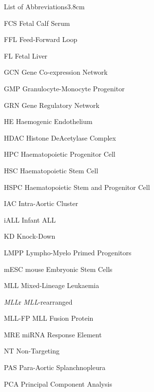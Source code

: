 \begin{mclistof}{List of Abbreviations}{3.8cm}
\item[FCS] Fetal Calf Serum

\item[FFL] Feed-Forward Loop

\item[FL] Fetal Liver

\item[GCN] Gene Co-expression Network

\item[GMP] Granulocyte-Monocyte Progenitor

\item[GRN] Gene Regulatory Network

\item[HE] Haemogenic Endothelium

\item[HDAC] Histone DeAcetylase Complex

\item[HPC] Haematopoietic Progenitor Cell

\item[HSC] Haematopoietic Stem Cell

\item[HSPC] Haematopoietic Stem and Progenitor Cell

\item[IAC] Intra-Aortic Cluster

\item[iALL] Infant ALL

\item[KD] Knock-Down

\item[LMPP] Lympho-Myelo Primed Progenitors

\item[mESC] mouse Embryonic Stem Cells

\item[MLL] Mixed-Lineage Leukaemia

\item[\textit{MLL}r] \textit{MLL}-rearranged

\item[MLL-FP] MLL Fusion Protein

\item[MRE] miRNA Response Element

\item[NT] Non-Targeting

\item[PAS] Para-Aortic Splanchnopleura

\item[PCA] Principal Component Analysis


\end{mclistof}
